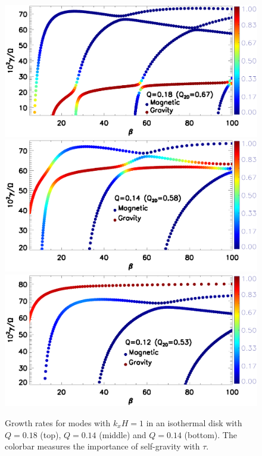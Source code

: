\begin{figure}
  \includegraphics[width=\linewidth,clip=true,trim=0cm 2.1cm 0cm
    0cm]{figures/compare_growth3_kx1_Q0d18.ps} 
  \includegraphics[width=\linewidth,clip=true,trim=0cm 2.1cm 0cm
    0.5cm]{figures/compare_growth3_kx1_Q0d14.ps} 
  \includegraphics[width=\linewidth,clip=true,trim=0cm 0cm 0cm
    0.5cm]{figures/compare_growth3_kx1_Q0d12.ps} 
  \caption{Growth rates for modes with $k_xH=1$ in an isothermal disk with
    $Q=0.18$ (top), $Q=0.14$ (middle) and $Q=0.14$ (bottom). The
    colorbar measures the importance of  
    self-gravity with $\tau$.   
    \label{compare_growth3}}
\end{figure}

